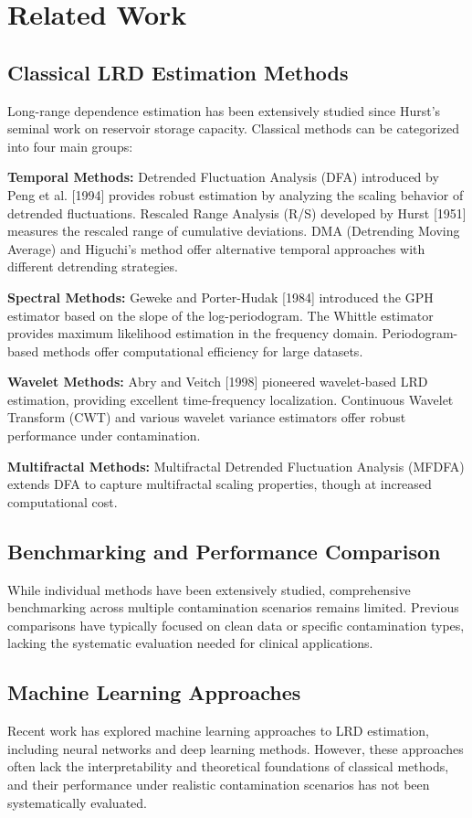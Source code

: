 \section{Related Work}

\subsection{Classical LRD Estimation Methods}

Long-range dependence estimation has been extensively studied since Hurst's seminal work on reservoir storage capacity. Classical methods can be categorized into four main groups:

\textbf{Temporal Methods:} Detrended Fluctuation Analysis (DFA) introduced by Peng et al. [1994] provides robust estimation by analyzing the scaling behavior of detrended fluctuations. Rescaled Range Analysis (R/S) developed by Hurst [1951] measures the rescaled range of cumulative deviations. DMA (Detrending Moving Average) and Higuchi's method offer alternative temporal approaches with different detrending strategies.

\textbf{Spectral Methods:} Geweke and Porter-Hudak [1984] introduced the GPH estimator based on the slope of the log-periodogram. The Whittle estimator provides maximum likelihood estimation in the frequency domain. Periodogram-based methods offer computational efficiency for large datasets.

\textbf{Wavelet Methods:} Abry and Veitch [1998] pioneered wavelet-based LRD estimation, providing excellent time-frequency localization. Continuous Wavelet Transform (CWT) and various wavelet variance estimators offer robust performance under contamination.

\textbf{Multifractal Methods:} Multifractal Detrended Fluctuation Analysis (MFDFA) extends DFA to capture multifractal scaling properties, though at increased computational cost.

\subsection{Benchmarking and Performance Comparison}

While individual methods have been extensively studied, comprehensive benchmarking across multiple contamination scenarios remains limited. Previous comparisons have typically focused on clean data or specific contamination types, lacking the systematic evaluation needed for clinical applications.

\subsection{Machine Learning Approaches}

Recent work has explored machine learning approaches to LRD estimation, including neural networks and deep learning methods. However, these approaches often lack the interpretability and theoretical foundations of classical methods, and their performance under realistic contamination scenarios has not been systematically evaluated.
